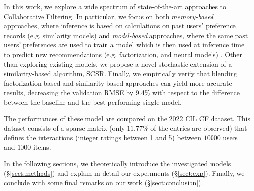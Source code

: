 \documentclass[sigconf]{acmart}
\begin{document}
In this work, we explore a wide spectrum of state-of-the-art approaches to Collaborative Filtering.
In particular, we focus on both \textit{memory-based} approaches, where inference is based on calculations on past users' preference records (e.g. similarity models) and \textit{model-based} approaches, where the same past users' preferences are used to train a model which is then used at inference time to predict new recommendations (e.g. factorization, and neural models) \cite{taxonomy}. 
Other than exploring existing models, we propose a novel stochastic extension of a similarity-based algorithm, SCSR.
Finally, we empirically verify that blending factorization-based and similarity-based approaches can yield more accurate results, decreasing the validation RMSE by 9.4\% with respect to the difference between the baseline and the best-performing single model.

The performances of these model are compared on the 2022 CIL CF dataset.
This dataset consists of a sparse matrix (only $11.77\%$ of the entries are observed) that defines the interactions (integer ratings between 1 and 5) between $10000$ users and $1000$ items.


In the following sections, 
we theoretically introduce the investigated models (§\ref{sect:methods}) and explain in detail our experiments (§\ref{sect:exp}). Finally, we conclude with some final remarks on our work (§\ref{sect:conclusion}).

\end{document}
